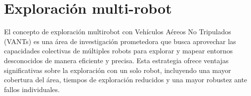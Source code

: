 
\section{Exploración multi-robot}

El concepto de exploración multirobot con Vehículos Aéreos No Tripulados (VANTs) es una área de investigación prometedora que busca aprovechar las capacidades colectivas de múltiples robots para explorar y mapear entornos desconocidos de manera eficiente y precisa. Esta estrategia ofrece ventajas significativas sobre la exploración con un solo robot, incluyendo una mayor cobertura del área, tiempos de exploración reducidos y una mayor robustez ante fallos individuales.


